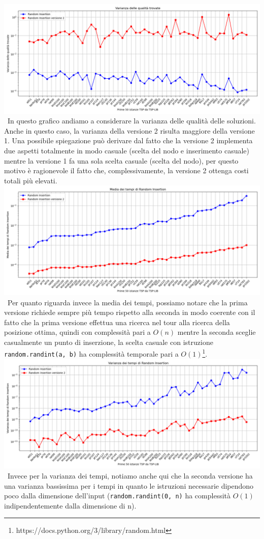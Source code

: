 \documentclass[a4paper,12pt]{report}
\begin{document}
\includegraphics[width=1\textwidth]{../Grafici/15.png} \
In questo grafico andiamo a considerare la varianza delle qualità delle soluzioni. Anche in questo caso, la varianza della versione 2 risulta maggiore della versione 1. Una possibile spiegazione può derivare dal fatto che la versione 2 implementa due aspetti totalmente in modo casuale (scelta del nodo e inserimento casuale) mentre la versione 1 fa una sola scelta casuale (scelta del nodo), per questo motivo è ragionevole il fatto che, complessivamente, la versione 2 ottenga costi totali più elevati. \newline
\includegraphics[width=1\textwidth]{../Grafici/16.png} \
Per quanto riguarda invece la media dei tempi, possiamo notare che la prima versione richiede sempre più tempo rispetto alla seconda in modo coerente con il fatto che la prima versione effettua una ricerca nel tour alla ricerca della posizione ottima, quindi con complessità pari a $O(n)$ mentre la seconda sceglie casualmente un punto di inserzione, la scelta casuale con istruzione \lstinline!random.randint(a, b)! ha complessità temporale pari a $O(1)$\footnote{https://docs.python.org/3/library/random.html}.\newline
\includegraphics[width=1\textwidth]{../Grafici/17.png} \
Invece per la varianza dei tempi, notiamo anche qui che la seconda versione ha una varianza bassissima per i tempi in quanto le istruzioni necessarie dipendono poco dalla dimensione dell'input (\lstinline!random.randint(0, n)! ha complessità $O(1)$ indipendentemente dalla dimensione di n). \newline
\end{document}
